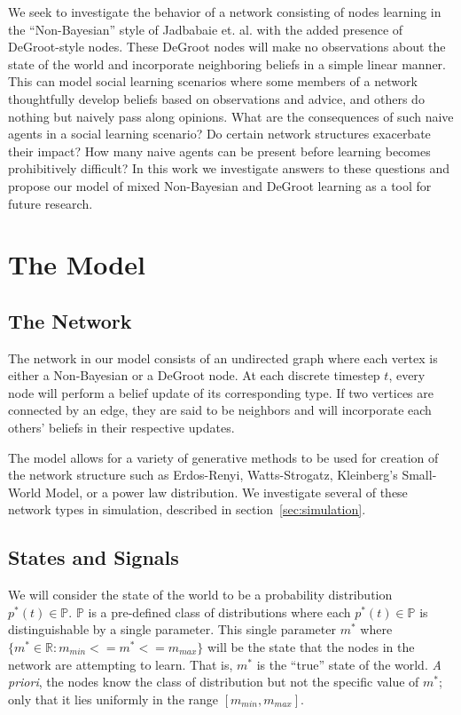 \documentclass[letterpaper, 11pt, conference]{ieeeconf}
\begin{document}
We seek to investigate the behavior of a network consisting of nodes learning in the ``Non-Bayesian'' style of Jadbabaie et. al. with the added presence of DeGroot-style nodes.  These DeGroot nodes will make no observations about the state of the world and incorporate neighboring beliefs in a simple linear manner.  This can model social learning scenarios where some members of a network thoughtfully develop beliefs based on observations and advice, and others do nothing but naively pass along opinions.  What are the consequences of such naive agents in a social learning scenario?  Do certain network structures exacerbate their impact?  How many naive agents can be present before learning becomes prohibitively difficult?  In this work we investigate answers to these questions and propose our model of mixed Non-Bayesian and DeGroot learning as a tool for future research.

\section{The Model}

\subsection{The Network}

The network in our model consists of an undirected graph where each vertex is either a Non-Bayesian or a DeGroot node.  At each discrete timestep $t$, every node will perform a belief update of its corresponding type.  If two vertices are connected by an edge, they are said to be neighbors and will incorporate each others' beliefs in their respective updates.

The model allows for a variety of generative methods to be used for creation of the network structure such as Erdos-Renyi, Watts-Strogatz, Kleinberg's Small-World Model, or a power law distribution.  We investigate several of these network types in simulation, described in section~\ref{sec:simulation}.

\subsection{States and Signals}

We will consider the state of the world to be a probability distribution $p^*(t) \in \mathbb{P}$.  $\mathbb{P}$ is a pre-defined class of distributions where each  $p^*(t) \in \mathbb{P}$ is distinguishable by a single parameter.  This single parameter $m^*$ where $\{m^* \in \mathbb{R}: m_{min} <= m^* <= m_{max} \}$  will be the state that the nodes in the network are attempting to learn.  That is, $m^*$ is the ``true'' state of the world.  \emph{A priori}, the nodes know the class of distribution but not the specific value of $m^*$; only that it lies uniformly in the range $[m_{min}, m_{max}]$.
\end{document}

